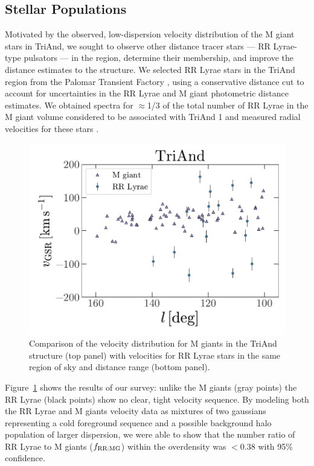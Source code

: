 \documentclass[galaxies,article,submit,moreauthors,pdftex,10pt,a4paper]{mdpi}
\newcommand{\frrmg}{\ensuremath{f_{\rm RR:MG}}}
\begin{document}
\subsection{Stellar Populations}
 \label{sec:populations}
Motivated by the observed, low-dispersion velocity distribution of the M giant stars in TriAnd, we sought to observe other distance tracer stars --- RR Lyrae-type pulsators --- in the region, determine their membership, and improve the distance estimates to the structure.
We selected RR Lyrae stars in the TriAnd region from the Palomar Transient
Factory \cite[PTF][]{ptf}, using a conservative distance cut to account for
uncertainties in the RR Lyrae and M giant photometric distance estimates.
We obtained spectra for $\approx$1/3 of the total number of RR Lyrae in the M
giant volume considered to be associated with TriAnd 1 and measured radial
velocities for these stars \cite{pricewhelan15}.

\begin{figure}[t]
\centering
\includegraphics[width=5 in]{figures/triand_rrlyrae}
\caption{\label{fig:apw}
Comparison of the velocity distribution for M giants in the TriAnd structure
(top panel) with velocities for RR Lyrae stars in the same region of sky and
distance range (bottom panel).
}
\end{figure}

Figure~\ref{fig:apw} \cite[reproduced from][]{pricewhelan15} shows the results of our survey: unlike the M giants (gray points) the RR Lyrae (black points) show no clear, tight velocity sequence.
By modeling both the RR Lyrae and M giants velocity data as mixtures of two gaussians representing a cold foreground sequence and a possible background halo population of larger dispersion, we were able to show that the number ratio of RR Lyrae to M giants (\frrmg) within the overdensity was $<0.38$ with 95\% confidence.
\end{document}
